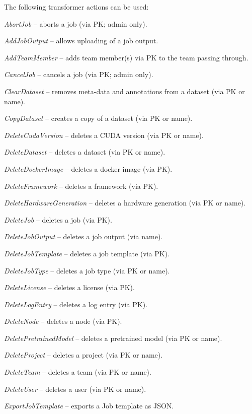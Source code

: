 \documentclass[a4paper]{book}
\begin{document}
The following transformer actions can be used:
\begin{tight_itemize}
  \item \textit{AbortJob} -- aborts a job (via PK; admin only).
  \item \textit{AddJobOutput} -- allows uploading of a job output.
  \item \textit{AddTeamMember} -- adds team member(s) via PK to the team passing through.
  \item \textit{CancelJob} -- cancels a job (via PK; admin only).
  \item \textit{ClearDataset} -- removes meta-data and annotations from a dataset (via PK or name).
  \item \textit{CopyDataset} -- creates a copy of a dataset (via PK or name).
  \item \textit{DeleteCudaVersion} -- deletes a CUDA version (via PK or name).
  \item \textit{DeleteDataset} -- deletes a dataset (via PK or name).
  \item \textit{DeleteDockerImage} -- deletes a docker image (via PK).
  \item \textit{DeleteFramework} -- deletes a framework (via PK).
  \item \textit{DeleteHardwareGeneration} -- deletes a hardware generation (via PK or name).
  \item \textit{DeleteJob} -- deletes a job (via PK).
  \item \textit{DeleteJobOutput} -- deletes a job output (via name).
  \item \textit{DeleteJobTemplate} -- deletes a job template (via PK).
  \item \textit{DeleteJobType} -- deletes a job type (via PK or name).
  \item \textit{DeleteLicense} -- deletes a license (via PK).
  \item \textit{DeleteLogEntry} -- deletes a log entry (via PK).
  \item \textit{DeleteNode} -- deletes a node (via PK).
  \item \textit{DeletePretrainedModel} -- deletes a pretrained model (via PK or name).
  \item \textit{DeleteProject} -- deletes a project (via PK or name).
  \item \textit{DeleteTeam} -- deletes a team (via PK or name).
  \item \textit{DeleteUser} -- deletes a user (via PK or name).
  \item \textit{ExportJobTemplate} -- exports a Job template as JSON.

\end{tight_itemize}
\end{document}
